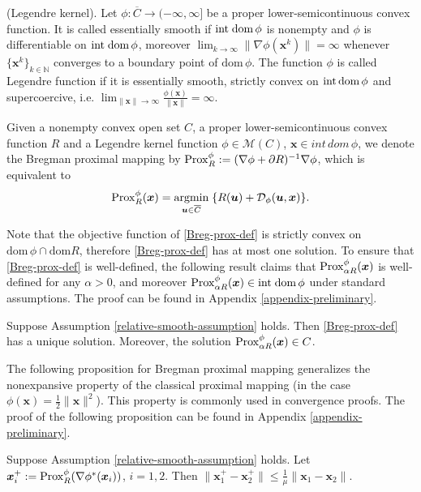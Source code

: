 \documentclass[twoside,11pt]{article}
\newcommand{\cD}{\mathcal D}
\newcommand{\cM}{\mathcal M}
\DeclareMathOperator*{\argmin}{argmin}
\def\vu{{\bm{u}}}
\def\vx{{\bm{x}}}
\begin{document}
\begin{definition}\label{Legendre}
(Legendre kernel). Let $\phi:{\overline{C}}\rightarrow(-\infty,\infty]$ be a proper
lower-semicontinuous convex function. 
It is called essentially smooth if $\text{int\;dom}\,\phi$ is nonempty and $\phi$ is differentiable on $\text{int\;dom}\,\phi$, moreover $\lim_{k\rightarrow\infty}\|\nabla\phi({\vx^k})\|=\infty$ whenever $\{{\vx^k}\}_{k\in\mathbb N}$ converges to a boundary point of $\text{dom}\,\phi$. The function $\phi$ is called Legendre function if it is essentially smooth, {strictly} convex on $\text{int\,dom}\,\phi$ and supercoercive, i.e. $\lim_{\|\vx\|\rightarrow\infty}\frac{\phi(\vx)}{\|\vx\|}=\infty$.
\end{definition}

\begin{definition}\label{Bregman-prox-maping}
Given a nonempty convex open set $C$, a proper lower-semicontinuous convex function $R$ and a Legendre kernel function $\phi\in\cM(C)$, $\vx\in int\,dom\,\phi$, we denote the Bregman proximal mapping by ${\rm Prox}^\phi_R:=(\nabla\phi+\partial R)^{-1}\nabla\phi$, which is equivalent to 
\begin{equation}
{\rm Prox}^\phi_R(\vx)=\argmin_{\vu\in\overline{C}}\;\{R(\vu)+\cD_\phi(\vu,\vx)\}.
\label{Breg-prox-def}
\end{equation}  
\end{definition}


Note that the objective function of \eqref{Breg-prox-def} is strictly convex on $\text{dom}\,\phi\cap \text{dom}R$, therefore \eqref{Breg-prox-def} has at most one solution. To ensure that \eqref{Breg-prox-def} is well-defined, the following result claims that ${\rm Prox}^\phi_{\alpha R}(\vx)$ is well-defined for any $\alpha>0$, and moreover ${\rm Prox}^\phi_{\alpha R}(\vx)\in\text{int\;dom}\,\phi$ under standard assumptions. The proof can be found in Appendix \ref{appendix-preliminary}.
\begin{lemma}
Suppose Assumption \ref{relative-smooth-assumption} holds. Then \eqref{Breg-prox-def} has a unique solution. Moreover, the solution ${\rm Prox}^\phi_{\alpha R}(\vx)\in C$. 
\label{well-def-Breg-prox}
\end{lemma}
The following proposition for Bregman proximal mapping generalizes the nonexpansive property of the classical proximal mapping (in the case $\phi(\vx)=\frac{1}{2}\|\vx\|^2$). This property is commonly used in convergence proofs. The proof of the following proposition can be found in Appendix \ref{appendix-preliminary}.
\begin{proposition}
 Suppose Assumption \ref{relative-smooth-assumption} holds. Let $\vx_i^+:={\rm Prox}^\phi_R(\nabla\phi^*(\vx_i))$, $i=1,2$. Then $\|\vx^+_1-\vx^+_2\|\leq\frac{1}{\mu}\|\vx_1-\vx_2\|$.
\label{nonexpansive}
\end{proposition}
\end{document}
